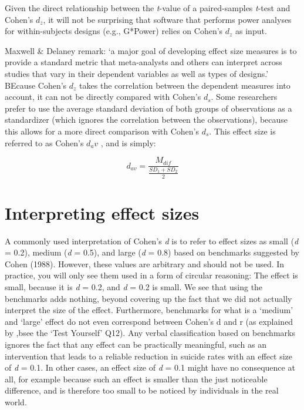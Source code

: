 \documentclass[
]{krantz}
\begin{document}
Given the direct relationship between the \emph{t}-value of a paired-samples \emph{t}-test and Cohen's \(d_z\), it will not be surprising that software that performs power analyses for within-subjects designs (e.g., G*Power) relies on Cohen's \(d_z\) as input.

Maxwell \& Delaney \citeyearpar{maxwell_designing_2004} remark: `a major goal of developing effect size measures is to provide a standard metric that meta-analysts and others can interpret across studies that vary in their dependent variables as well as types of designs.' BEcause Cohen's \(d_z\) takes the correlation between the dependent measures into account, it can not be directly compared with Cohen's \(d_s\). Some researchers prefer to use the average standard deviation of both groups of observations as a standardizer (which ignores the correlation between the observations), because this allows for a more direct comparison with Cohen's \(d_s\). This effect size is referred to as Cohen's \(d_av\) \citep{cumming_understanding_2013}, and is simply:

\[d_{av} = \frac{M_{dif}}{\frac{SD_1+SD_2}{2}}\]

\hypertarget{interpreting-effect-sizes}{%
\section{Interpreting effect sizes}\label{interpreting-effect-sizes}}

A commonly used interpretation of Cohen's \emph{d} is to refer to effect sizes as small (\emph{d} = 0.2), medium (\emph{d} = 0.5), and large (\emph{d} = 0.8) based on benchmarks suggested by Cohen (1988). However, these values are arbitrary and should not be used. In practice, you will only see them used in a form of circular reasoning: The effect is small, because it is \emph{d} = 0.2, and \emph{d} = 0.2 is small. We see that using the benchmarks adds nothing, beyond covering up the fact that we did not actually interpret the size of the effect. Furthermore, benchmarks for what is a `medium' and `large' effect do not even correspond between Cohen's d and r (as explained by \citet{mcgrath_when_2006},bsee the `Test Yourself' Q12). Any verbal classification based on benchmarks ignores the fact that any effect can be practically meaningful, such as an intervention that leads to a reliable reduction in suicide rates with an effect size of \emph{d} = 0.1. In other cases, an effect size of \emph{d} = 0.1 might have no consequence at all, for example because such an effect is smaller than the just noticeable difference, and is therefore too small to be noticed by individuals in the real world.
\end{document}
